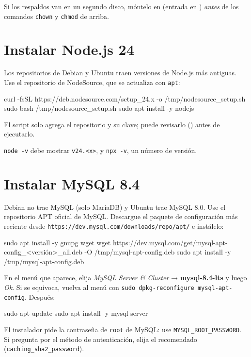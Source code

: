 Si los respaldos van en un segundo disco, móntelo en  (entrada en
) \emph{antes} de los comandos \texttt{chown} y \texttt{chmod} de arriba.

\section{Instalar Node.js 24}

Los repositorios de Debian y Ubuntu traen versiones de Node.js más antiguas. Use el repositorio
de NodeSource, que se actualiza con \texttt{apt}:

\begin{codigo}
curl -fsSL https://deb.nodesource.com/setup_24.x -o /tmp/nodesource_setup.sh
sudo bash /tmp/nodesource_setup.sh
sudo apt install -y nodejs
\end{codigo}

El script solo agrega el repositorio y su clave; puede revisarlo
() antes de ejecutarlo.

\begin{comprobar}
	\texttt{node -v} debe mostrar \texttt{v24.<x>}, y \texttt{npx -v}, un número de versión.
\end{comprobar}

\section{Instalar MySQL 8.4}

Debian no trae MySQL (solo MariaDB) y Ubuntu trae MySQL 8.0. Use el repositorio APT oficial de
MySQL. Descargue el paquete de configuración más reciente desde
\texttt{https://dev.mysql.com/downloads/repo/apt/} e instálelo:

\begin{codigo}
sudo apt install -y gnupg wget
wget https://dev.mysql.com/get/mysql-apt-config_<versión>_all.deb -O /tmp/mysql-apt-config.deb
sudo apt install -y /tmp/mysql-apt-config.deb
\end{codigo}

En el menú que aparece, elija \emph{MySQL Server \& Cluster} → \textbf{mysql-8.4-lts} y luego
\emph{Ok}. Si se equivoca, vuelva al menú con \texttt{sudo dpkg-reconfigure mysql-apt-config}.
Después:

\begin{codigo}
sudo apt update
sudo apt install -y mysql-server
\end{codigo}

El instalador pide la contraseña de \texttt{root} de MySQL: use \texttt{MYSQL\_ROOT\_PASSWORD}.
Si pregunta por el método de autenticación, elija el recomendado (\texttt{caching\_sha2\_password}).

